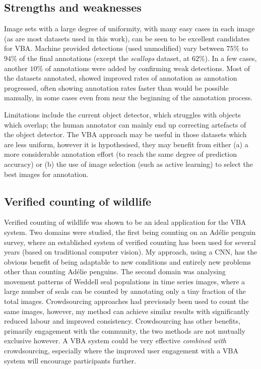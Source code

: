 \subsection{Strengths and weaknesses}

Image sets with a large degree of uniformity, with many easy cases in each image (as are most datasets used in this work), can be seen to be excellent candidates for \gls{VBA}. Machine provided detections (used unmodified) vary between $75\%$ to $94\%$ of the final annotations (except the \emph{scallops} dataset, at $62\%$). In a few cases, another $10\%$ of annotations were added by confirming weak detections. Most of the datasets annotated, showed improved rates of annotation as annotation progressed, often showing annotation rates faster than would be possible manually, in some cases even from near the beginning of the annotation process. 

Limitations include the current object detector, which struggles with objects which overlap; the human annotator can mainly end up correcting artefacts of the object detector. The \gls{VBA} approach may be useful in those datasets which are less uniform, however it is hypothesised, they may benefit from either (a) a more considerable annotation effort (to reach the same degree of prediction accuracy) or (b) the use of image selection (such as active learning) to select the best images for annotation.

\subsection{Verified counting of wildlife}

Verified counting of wildlife was shown to be an ideal application for the \gls{VBA} system. Two domains were studied, the first being counting on an Ad\'elie penguin survey, where an established system of verified counting has been used for several years (based on traditional computer vision). My approach, using a \gls{CNN}, has the obvious benefit of being adaptable to new conditions and entirely new problems other than counting Ad\'elie penguins. The second domain was analysing movement patterns of Weddell seal populations in time series images, where a large number of seals can be counted by annotating only a tiny fraction of the total images. Crowdsourcing approaches had previously been used to count the same images, however, my method can achieve similar results with significantly reduced labour and improved consistency. Crowdsourcing has other benefits, primarily engagement with the community, the two methods are not mutually exclusive however. A \gls{VBA} system could be very effective \emph{combined with} crowdsourcing, especially where the improved user engagement with a \gls{VBA} system will encourage participants further.

